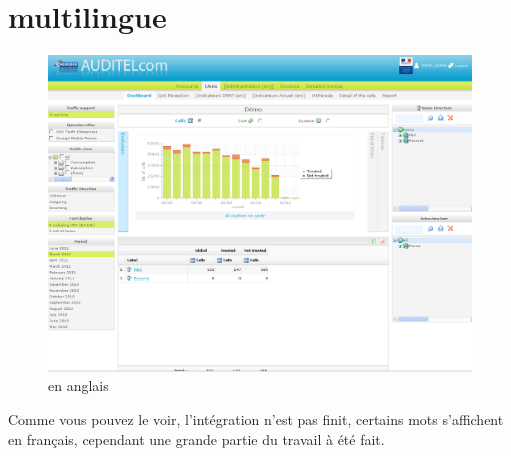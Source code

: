         \section{\adt{} multilingue}
        \begin{figure}[H]
        \centering
        \includegraphics[angle=90,width=16.5cm]{images/annexes/resultats/adtAnglais.png}
        \caption{\adt{} en anglais}
        \label{adtAnglais}
    \end{figure}
            Comme vous pouvez le voir, l'intégration n'est pas finit, certains mots s'affichent en français, cependant une grande partie du travail à été fait.



